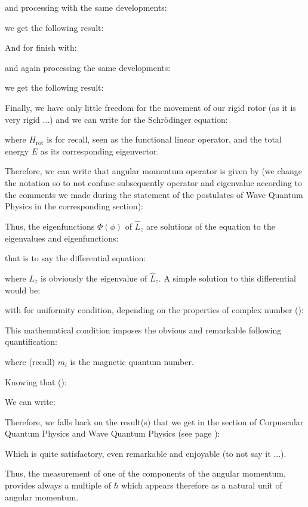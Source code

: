 	and processing with the same developments:
	
	we get the following result:
	
	And for finish with:
	
	and again processing the same developments:
	
	we get the following result:
	
	Finally, we have only little freedom for the movement of our rigid rotor (as it is very rigid ...) and we can write for the Schrödinger equation:
	
	where $H_\text{rot}$ is for recall, seen as the functional linear operator, and the total energy $E$ as its corresponding eigenvector.

	Therefore, we can write that angular momentum operator is given by (we change the notation so to not confuse subsequently operator and eigenvalue according to the comments we made during the statement of the postulates of Wave Quantum Physics in the corresponding section):
	
	Thus, the eigenfunctions $\Phi(\phi)$ of $\hat{L}_z$ are solutions of the equation to the eigenvalues and eigenfunctions:
	
	that is to say the differential equation:
	
	where $L_z$ is obviously the eigenvalue of $\hat{L}_z$. A simple solution to this differential would be:
	
	with for uniformity condition, depending on the properties of complex number ():
	
	This mathematical condition imposes the obvious and remarkable following quantification:
	
	where (recall) $m_l$ is the magnetic quantum number.

	Knowing that ():
	
	We can write:
	
	Therefore, we falls back on the result(s) that we get in the section of Corpuscular Quantum Physics and Wave Quantum Physics (see page \pageref{angular momentum and spin}):
	
	Which is quite satisfactory, even remarkable and enjoyable (to not say it ...).
	
	Thus, the measurement of one of the components of the angular momentum, provides always a multiple of $\hbar$ which appears therefore as a natural unit of angular momentum.
	
